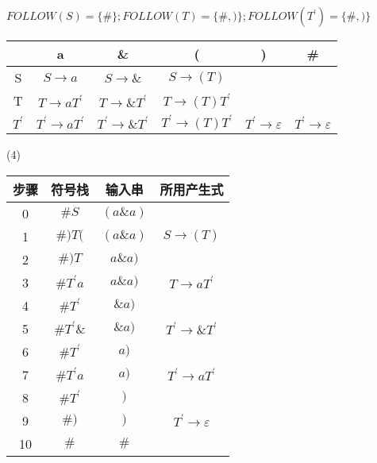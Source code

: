 \documentclass{article}
\begin{document}
$FOLLOW(S)=\{\# \};FOLLOW(T)=\{\#,)\};FOLLOW(T^{'})=\{\#,)\}$
\begin{center}
    \begin{tabular}[h]{|c|c|c|c|c|c|}\hline
        ~       & a                          & \&                          & (                            & )                               & \#                              \\\hline
        S       & $S \rightarrow a$          & $S \rightarrow \&$          & $S \rightarrow (T)$          & ~                               & ~                               \\\hline
        T       & $T \rightarrow aT^{'}$     & $T \rightarrow \&T^{'}$     & $T \rightarrow (T)T^{'}$     & ~                               & ~                               \\\hline
        $T^{'}$ & $T^{'} \rightarrow aT^{'}$ & $T^{'} \rightarrow \&T^{'}$ & $T^{'} \rightarrow (T)T^{'}$ & $T^{'} \rightarrow \varepsilon$ & $T^{'} \rightarrow \varepsilon$ \\\hline
    \end{tabular}
\end{center}
\newpage
(4)
\begin{center}
    \begin{tabular}{|c|c|c|c|}\hline
        步骤 & 符号栈      & 输入串   & 所用产生式                      \\\hline
        0    & $\#S$       & $(a\&a)$ &                                 \\\hline
        1    & $\#)T($     & $(a\&a)$ & $S \rightarrow (T)$             \\\hline
        2    & $\#)T$      & $a\&a)$  &                                 \\\hline
        3    & $\#T^{'}a$  & $a\&a)$  & $T \rightarrow aT^{'}$          \\\hline
        4    & $\#T^{'}$   & $\&a)$   &                                 \\\hline
        5    & $\#T^{'}\&$ & $\&a)$   & $T^{'} \rightarrow \&T^{'}$     \\\hline
        6    & $\#T^{'}$   & $a)$     &                                 \\\hline
        7    & $\#T^{'}a$  & $a)$     & $T^{'} \rightarrow aT^{'}$      \\\hline
        8    & $\#T^{'}$   & $)$      &                                 \\\hline
        9    & $\#)$       & $)$      & $T^{'} \rightarrow \varepsilon$ \\\hline
        10   & $\#$        & $\#$     & ~                               \\\hline
    \end{tabular}
\end{center}
\end{document}
